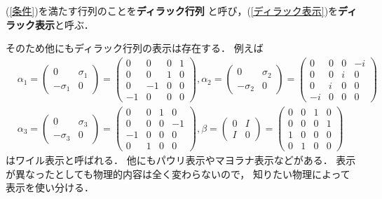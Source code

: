 \documentclass[a4paper,11pt]{jsarticle}
\numberwithin{equation}{section}
\begin{document}
(\ref{条件})を満たす行列のことを\textbf{ディラック行列}
と呼び，(\ref{ディラック表示})を\textbf{ディラック表示}と呼ぶ．

そのため他にもディラック行列の表示は存在する．
例えば
\begin{equation}
  \begin{aligned}
    &\alpha_1 = \left(
      \begin{array}{cc}
        0 & \sigma_1 \\
        -\sigma_1 & 0 
      \end{array}
      \right)
    = \left(
      \begin{array}{cccc}
        0 & 0 & 0 & 1 \\
        0 & 0 & 1 & 0 \\
        0 &-1 & 0 & 0 \\
      -1 & 0 & 0 & 0
      \end{array}
      \right),　
    \alpha_2 = \left(
      \begin{array}{cc}
        0 & \sigma_2 \\
        -\sigma_2 & 0 
      \end{array}
      \right)
    = \left(
      \begin{array}{cccc}
        0 & 0 & 0 & -i\\
        0 & 0 & i & 0 \\
        0 & i & 0 & 0 \\
       -i & 0 & 0 & 0
      \end{array}
      \right)\\
    &\alpha_3 = \left(
        \begin{array}{cc}
          0 & \sigma_3 \\
          -\sigma_3 & 0 
        \end{array}
        \right)
      = \left(
        \begin{array}{cccc}
          0 & 0 & 1 & 0 \\
          0 & 0 & 0 & -1\\
         -1 & 0 & 0 & 0 \\
          0 & 1 & 0 & 0
        \end{array}
        \right),　
      \beta = \left(
        \begin{array}{cc}
          0 & I \\
          I & 0 
        \end{array}
        \right)
      = \left(
        \begin{array}{cccc}
          0 & 0 & 1 & 0 \\
          0 & 0 & 0 & 1 \\
          1 & 0 & 0 & 0 \\
          0 & 1 & 0 & 0 
        \end{array}
        \right)
  \end{aligned}
\label{ワイル表示}
\end{equation}
はワイル表示と呼ばれる．
他にもパウリ表示やマヨラナ表示などがある．
表示が異なったとしても物理的内容は全く変わらないので，
知りたい物理によって表示を使い分ける．
\end{document}

